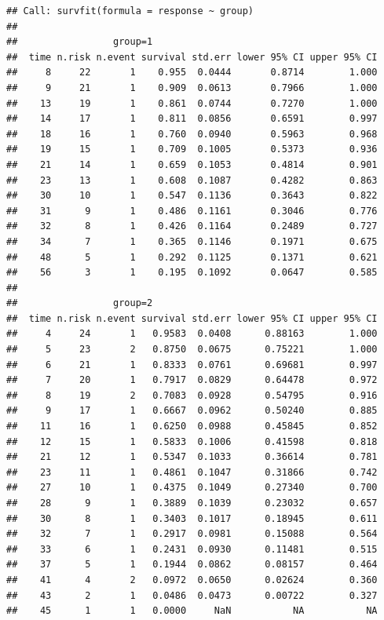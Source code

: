 \documentclass[
  12pt,
]{book}
\begin{document}
\begin{verbatim}
## Call: survfit(formula = response ~ group)
## 
##                 group=1 
##  time n.risk n.event survival std.err lower 95% CI upper 95% CI
##     8     22       1    0.955  0.0444       0.8714        1.000
##     9     21       1    0.909  0.0613       0.7966        1.000
##    13     19       1    0.861  0.0744       0.7270        1.000
##    14     17       1    0.811  0.0856       0.6591        0.997
##    18     16       1    0.760  0.0940       0.5963        0.968
##    19     15       1    0.709  0.1005       0.5373        0.936
##    21     14       1    0.659  0.1053       0.4814        0.901
##    23     13       1    0.608  0.1087       0.4282        0.863
##    30     10       1    0.547  0.1136       0.3643        0.822
##    31      9       1    0.486  0.1161       0.3046        0.776
##    32      8       1    0.426  0.1164       0.2489        0.727
##    34      7       1    0.365  0.1146       0.1971        0.675
##    48      5       1    0.292  0.1125       0.1371        0.621
##    56      3       1    0.195  0.1092       0.0647        0.585
## 
##                 group=2 
##  time n.risk n.event survival std.err lower 95% CI upper 95% CI
##     4     24       1   0.9583  0.0408      0.88163        1.000
##     5     23       2   0.8750  0.0675      0.75221        1.000
##     6     21       1   0.8333  0.0761      0.69681        0.997
##     7     20       1   0.7917  0.0829      0.64478        0.972
##     8     19       2   0.7083  0.0928      0.54795        0.916
##     9     17       1   0.6667  0.0962      0.50240        0.885
##    11     16       1   0.6250  0.0988      0.45845        0.852
##    12     15       1   0.5833  0.1006      0.41598        0.818
##    21     12       1   0.5347  0.1033      0.36614        0.781
##    23     11       1   0.4861  0.1047      0.31866        0.742
##    27     10       1   0.4375  0.1049      0.27340        0.700
##    28      9       1   0.3889  0.1039      0.23032        0.657
##    30      8       1   0.3403  0.1017      0.18945        0.611
##    32      7       1   0.2917  0.0981      0.15088        0.564
##    33      6       1   0.2431  0.0930      0.11481        0.515
##    37      5       1   0.1944  0.0862      0.08157        0.464
##    41      4       2   0.0972  0.0650      0.02624        0.360
##    43      2       1   0.0486  0.0473      0.00722        0.327
##    45      1       1   0.0000     NaN           NA           NA
\end{verbatim}
\end{document}
